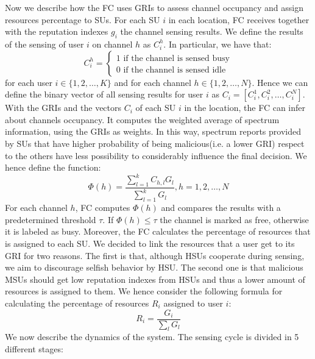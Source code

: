 \documentclass[letterpaper, 10 pt, conference]{ieeeconf}  %
\begin{document}
Now we describe how the FC uses GRIs to assess channel occupancy and assign resources percentage to SUs. For each SU $i$ in each location, FC receives together with the reputation indexes $g_i$ the channel sensing results. 
We define the results of the sensing of user $i$ on channel $h$ as $C^h_i$. In particular, we have that:
$$
C^h_i=
\begin{cases}
1 \text{ if the channel is sensed busy}\\
0 \text{ if the channel is sensed idle}
\end{cases}
$$
for each user $i\in \{1,2,\dots,K\}$ and for each channel $h \in \{1,2,\dots,N\}$. Hence we can define the binary vector of all sensing results for user $i$ as $C_i=[C^1_i,C^2_i,\dots,C^N_i]$.
With the GRIs and the vectors $C_i$ of each SU $i$ in the location, the FC can infer about channels occupancy. It computes the weighted average of spectrum information, using the GRIs as weights. In this way, spectrum reports provided by SUs that have higher probability of being malicious(i.e. a lower GRI) respect to the others have less possibility to considerably influence the final decision. We hence define the function:
\begin{equation}
\Phi(h)=\frac{\sum\limits_{l=1}^{k}C_{h,l}G_l}{\sum\limits_{l=1}^k G_l}, h=1,2,\dots,N
\label{copp}
\end{equation}
For each channel $h$, FC computes $\Phi(h)$ and compares the results with a predetermined threshold $\tau$. If $\Phi(h)\leq\tau$ the channel is marked as free, otherwise it is labeled as busy.
Moreover, the FC calculates the percentage of resources that is assigned to each SU. We decided to link the resources that a user get to its GRI for two reasons. The first is that, although HSUs cooperate during sensing, we aim to discourage selfish behavior by HSU. The second one is that malicious MSUs should get low reputation indexes from HSUs and thus a lower amount of resources is assigned to them. We hence consider the following formula for calculating the percentage of resources $R_i$ assigned to user $i$:
\begin{equation}
R_i=\frac{G_i}{\sum\limits_l G_l}
\label{res}
\end{equation}
We now describe the dynamics of the system. The sensing cycle is divided in 5 different stages:
\end{document}
